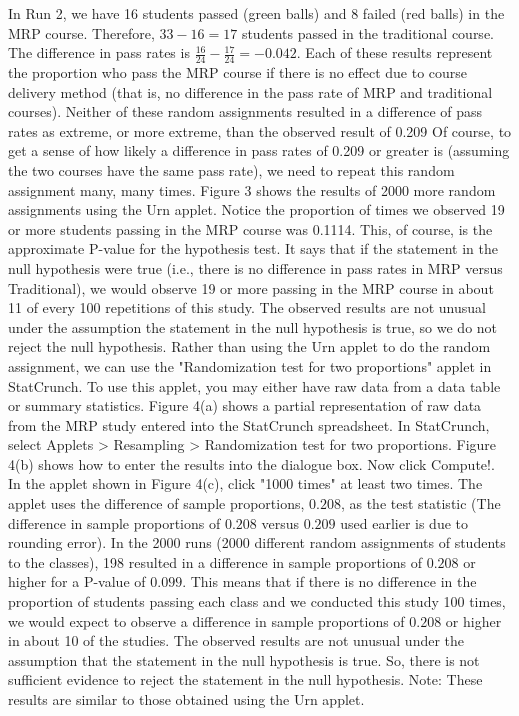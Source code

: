 \documentclass{report}
\begin{document}
    \bigbreak \noindent 
    In Run 2, we have 16 students passed (green balls) and 8 failed (red balls) in the MRP course. Therefore, $33 - 16 = 17$ students passed in the traditional course. The difference in pass rates is $\frac{16}{24} - \frac{17}{24} = -0.042$.
    \bigbreak \noindent 
    Each of these results represent the proportion who pass the MRP course if there is no effect due to course delivery method (that is, no difference in the pass rate of MRP and traditional courses). Neither of these random assignments resulted in a difference of pass rates as extreme, or more extreme, than the observed result of 0.209
    \bigbreak \noindent 
    Of course, to get a sense of how likely a difference in pass rates of 0.209 or greater is (assuming the two courses have the same pass rate), we need to repeat this random assignment many, many times. Figure 3 shows the results of 2000 more random assignments using the Urn applet. Notice the proportion of times we observed 19 or more students passing in the MRP course was 0.1114. This, of course, is the approximate P-value for the hypothesis test. It says that if the statement in the null hypothesis were true (i.e., there is no difference in pass rates in MRP versus Traditional), we would observe 19 or more passing in the MRP course in about 11 of every 100 repetitions of this study. The observed results are not unusual under the assumption the statement in the null hypothesis is true, so we do not reject the null hypothesis.
    \bigbreak \noindent 
    Rather than using the Urn applet to do the random assignment, we can use the "Randomization test for two proportions" applet in StatCrunch. To use this applet, you may either have raw data from a data table or summary statistics. Figure 4(a) shows a partial representation of raw data from the MRP study entered into the StatCrunch spreadsheet. In StatCrunch, select Applets > Resampling > Randomization test for two proportions. Figure 4(b) shows how to enter the results into the dialogue box. Now click Compute!. In the applet shown in Figure 4(c), click "1000 times" at least two times. The applet uses the difference of sample proportions, $0.208$, as the test statistic (The difference in sample proportions of $0.208$ versus $0.209$ used earlier is due to rounding error). In the 2000 runs (2000 different random assignments of students to the classes), 198 resulted in a difference in sample proportions of $0.208$ or higher for a P-value of $0.099$. This means that if there is no difference in the proportion of students passing each class and we conducted this study 100 times, we would expect to observe a difference in sample proportions of $0.208$ or higher in about 10 of the studies. The observed results are not unusual under the assumption that the statement in the null hypothesis is true. So, there is not sufficient evidence to reject the statement in the null hypothesis. Note: These results are similar to those obtained using the Urn applet.
\end{document}
